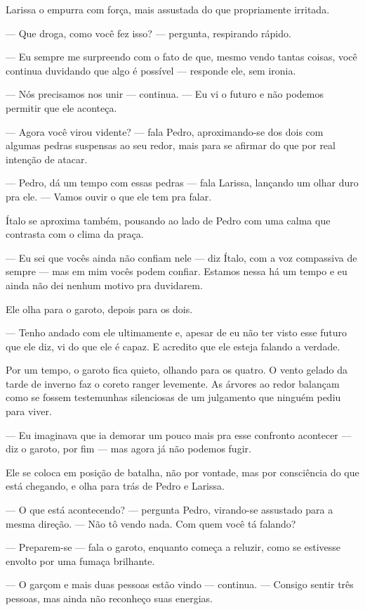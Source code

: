 Larissa o empurra com força, mais assustada do que propriamente irritada.

— Que droga, como você fez isso? — pergunta, respirando rápido.

— Eu sempre me surpreendo com o fato de que, mesmo vendo tantas coisas, você continua duvidando que algo é possível — responde ele, sem ironia.

— Nós precisamos nos unir — continua. — Eu vi o futuro e não podemos permitir que ele aconteça.

— Agora você virou vidente? — fala Pedro, aproximando-se dos dois com algumas pedras suspensas ao seu redor, mais para se afirmar do que por real intenção de atacar.

— Pedro, dá um tempo com essas pedras — fala Larissa, lançando um olhar duro pra ele. — Vamos ouvir o que ele tem pra falar.

Ítalo se aproxima também, pousando ao lado de Pedro com uma calma que contrasta com o clima da praça.

— Eu sei que vocês ainda não confiam nele — diz Ítalo, com a voz compassiva de sempre — mas em mim vocês podem confiar.  
Estamos nessa há um tempo e eu ainda não dei nenhum motivo pra duvidarem.

Ele olha para o garoto, depois para os dois.

— Tenho andado com ele ultimamente e, apesar de eu não ter visto esse futuro que ele diz, vi do que ele é capaz.  
E acredito que ele esteja falando a verdade.

Por um tempo, o garoto fica quieto, olhando para os quatro.  
O vento gelado da tarde de inverno faz o coreto ranger levemente.  
As árvores ao redor balançam como se fossem testemunhas silenciosas de um julgamento que ninguém pediu para viver.

— Eu imaginava que ia demorar um pouco mais pra esse confronto acontecer — diz o garoto, por fim — mas agora já não podemos fugir.

Ele se coloca em posição de batalha, não por vontade, mas por consciência do que está chegando, e olha para trás de Pedro e Larissa.

— O que está acontecendo? — pergunta Pedro, virando-se assustado para a mesma direção. — Não tô vendo nada. Com quem você tá falando?

— Preparem-se — fala o garoto, enquanto começa a reluzir, como se estivesse envolto por uma fumaça brilhante.

— O garçom e mais duas pessoas estão vindo — continua. — Consigo sentir três pessoas, mas ainda não reconheço suas energias.

